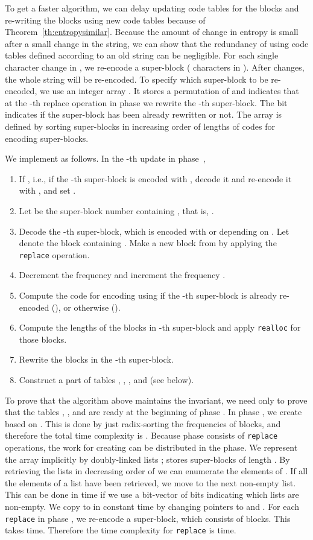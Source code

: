 \documentclass{llncs}
\begin{document}
To get a faster algorithm, we can delay updating code tables for the
blocks and re-writing the blocks using new code tables
because of Theorem~\ref{th:entropysimilar}.  Because the amount of change
in entropy is small after a small change in the string,  we can show that
the redundancy of using code tables defined according to an old string can be
negligible.  
For each single character change in , we re-encode
a super-block ( characters in ).
After  changes, the whole string will be re-encoded.
To specify which super-block to be re-encoded,
we use an integer array .
It stores a permutation of
 and indicates
that at the -th replace operation in phase 
we rewrite the -th super-block.
The bit  indicates 
if the super-block has been already rewritten or not.
The array  is defined by sorting super-blocks
in increasing order of lengths of codes for encoding super-blocks.

We implement  as follows.
In the -th update in phase~,
\begin{enumerate}
\item
If , i.e., 
if the -th super-block is encoded with ,
decode it and re-encode it with , and
set .
\item
Let  be the super-block number containing ,
 that is, .
\item
Decode the -th super-block, which is encoded with  or
 depending on .
Let  denote the block containing .
Make a new block  from  by applying the \texttt{replace} operation.
\item
Decrement the frequency  
and increment the frequency .
\item
Compute the code for encoding  using  if the -th super-block
is already re-encoded (), or  otherwise ().
\item
Compute the lengths of the blocks in -th super-block and apply
\texttt{realloc} for those blocks.
\item
Rewrite the blocks in the -th super-block.
\item
Construct a part of tables , , , and 
(see below).
\end{enumerate}

To prove that the algorithm above maintains the invariant, we need only to prove
that the tables , , and 
are ready at the beginning of phase .
In phase , we create  based on .  
This is done by just radix-sorting
the frequencies of blocks, and therefore the total time complexity is
.
Because phase  consists of 
 \texttt{replace} operations, the work for creating 
can be distributed in the phase.
We represent the array  implicitly by 
 doubly-linked lists ; 
 stores super-blocks of length .  By retrieving the lists 
in decreasing order of  we can
enumerate the elements of .  If all the elements of a list have been
retrieved, we move to the next non-empty list.  This can be done in 
 time if we use a bit-vector of
 bits indicating which lists are non-empty.
We copy  to  in constant time
by changing pointers to  and .
For each \texttt{replace} in phase , 
we re-encode a super-block, which consists of
 blocks.  This takes  time.
Therefore the time complexity for \texttt{replace} is  time.
\end{document}
